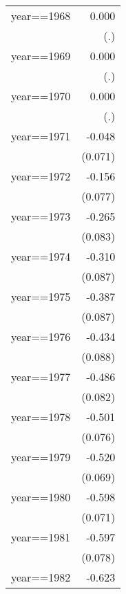 \begin{table}[htbp]
\begin{tabular}{l*{1}{D{.}{.}{-1}}}
\addlinespace
year==1968          &       0.000         \\
                    &         (.)         \\
\addlinespace
year==1969          &       0.000         \\
                    &         (.)         \\
\addlinespace
year==1970          &       0.000         \\
                    &         (.)         \\
\addlinespace
year==1971          &      -0.048         \\
                    &     (0.071)         \\
\addlinespace
year==1972          &      -0.156\sym{**} \\
                    &     (0.077)         \\
\addlinespace
year==1973          &      -0.265\sym{***}\\
                    &     (0.083)         \\
\addlinespace
year==1974          &      -0.310\sym{***}\\
                    &     (0.087)         \\
\addlinespace
year==1975          &      -0.387\sym{***}\\
                    &     (0.087)         \\
\addlinespace
year==1976          &      -0.434\sym{***}\\
                    &     (0.088)         \\
\addlinespace
year==1977          &      -0.486\sym{***}\\
                    &     (0.082)         \\
\addlinespace
year==1978          &      -0.501\sym{***}\\
                    &     (0.076)         \\
\addlinespace
year==1979          &      -0.520\sym{***}\\
                    &     (0.069)         \\
\addlinespace
year==1980          &      -0.598\sym{***}\\
                    &     (0.071)         \\
\addlinespace
year==1981          &      -0.597\sym{***}\\
                    &     (0.078)         \\
\addlinespace
year==1982          &      -0.623\sym{***}\\

\end{tabular}
\end{table}
